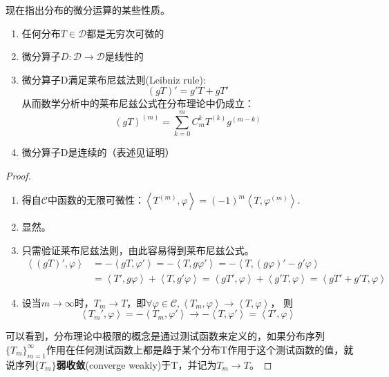 现在指出分布的微分运算的某些性质\cite{zorich}。
\begin{theorem}[分布的微分运算的性质]
    \begin{enumerate}
        \quad
    \item 任何分布$T\in\mathcal{D} $都是无穷次可微的
    \item 微分算子$D:\mathcal{D} \to\mathcal{D} $是线性的
    \item 微分算子D满足莱布尼兹法则(Leibniz rule):
          \[\left(gT\right)'=g'T+gT'\]从而数学分析中的莱布尼兹公式在分布理论中仍成立：
          \[\left(gT\right)^{(m)}=\sum_{k=0}^{m}C_m^k T^{(k)}g^{(m-k)}\]
    \item 微分算子D是连续的（表述见证明）
\end{enumerate}
\end{theorem}
\begin{proof}
\begin{enumerate}
    \item 得自$\mathcal{C} $中函数的无限可微性：$\left\langle T^{(m)},\varphi\right\rangle=(-1)^m\left\langle T,\varphi^{(m)}\right\rangle$.
    \item 显然。
    \item 只需验证莱布尼兹法则，由此容易得到莱布尼兹公式。
          \begin{align*}
              \left\langle (gT)',\varphi\right\rangle & =-\left\langle gT,\varphi'\right\rangle=-\left\langle T,g\varphi'\right\rangle=-\left\langle T,(g\varphi)'-g'\varphi\right\rangle                                            \\
                                           & =\left\langle T',g\varphi\right\rangle+\left\langle T,g'\varphi\right\rangle=\left\langle gT',\varphi\right\rangle+\left\langle g'T,\varphi\right\rangle=\left\langle gT'+g'T,\varphi\right\rangle
          \end{align*}
    \item 设当$m\to\infty$时，$T_m\to T$，即$\forall\varphi\in\mathcal{C} ,\left\langle T_m,\varphi\right\rangle\to\left\langle T,\varphi\right\rangle$，
          则\[\left\langle T_m',\varphi\right\rangle=-\left\langle T_m,\varphi'\right\rangle\to-\left\langle T,\varphi'\right\rangle=\left\langle T',\varphi\right\rangle\]
\end{enumerate}
可以看到，分布理论中极限的概念是通过测试函数来定义的，如果分布序列$\{T_m\}_{m=1}^{\infty}$作用在任何测试函数上都是趋于某个分布T作用于这个测试函数的值，就说序列$\{T_m\}$\textbf{弱收敛}(converge weakly)于T，并记为$T_m\to T$\cite{folland}。
\end{proof}

